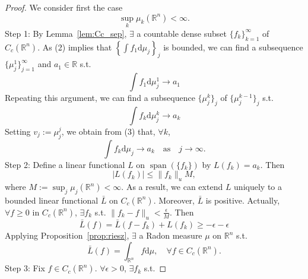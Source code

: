     \begin{proof}
    We consider first the case
        \begin{equation*}
            \sup_{k}\mu _{k}(\mathbb{R}^{n})<\infty. \tag{2}
        \end{equation*}
    Step 1:
    By Lemma~\ref{lem:Cc_sep}, $\exists$ a countable dense subset $\{ f_{k} \}_{k=1}^{\infty}$ of $C_{c}(\mathbb{R}^{n})$. As (2) implies that $\left\{  \int f_{1}\mathrm{d}\mu _{j}  \right\}_{j}$ is bounded, we can find a subsequence $\{ \mu _{j}^{1} \}_{j=1}^{\infty}$ and $a_{1}\in \mathbb{R}$ s.t.
        \begin{equation*}
            \int f_{1}\mathrm{d}\mu _{j}^{1}\to a_{1}
        \end{equation*}
    Repeating this argument, we can find a subsequence $\{ \mu _{j}^{k} \}_{j}$ of $\{ \mu _{j}^{k-1} \}_{j}$ s.t.
        \begin{equation*}
            \int f_{k}\mathrm{d}\mu _{j}^{k}\to a_{k}\tag{3}
        \end{equation*}
    Setting $v_{j}:=\mu _{j}^{j}$, we obtain from (3) that, $\forall k$,
        \begin{equation*}
            \int f_{k}\mathrm{d}\mu _{j}\to a_{k}\quad\text{as}\quad j\to \infty.
        \end{equation*}
    Step 2:
    Define a linear functional $L$ on $\operatorname{span}(\{ f_{k} \})$ by $L(f_{k})=a_{k}$. Then
        \begin{equation*}
            |L(f_{k})| \leq \| f_{k} \| _{u}M,
        \end{equation*}
    where $M:=\sup_{j}\mu _{j}(\mathbb{R}^{n})<\infty$. As a result, we can extend $L$ uniquely to a bounded linear functional $\bar{L}$ on $C_{c}(\mathbb{R}^{n})$. Moreover, $\bar{L}$ is positive. Actually, $\forall f\geq 0$ in $C_{c}(\mathbb{R}^{n})$, $\exists f_{k}$ s.t. $\| f_{k}-f \|_{u}< \frac{\epsilon}{M}$. Then
        \begin{equation*}
            \bar{L}(f)=\bar{L}(f-f_{k})+L(f_{k})\geq-\epsilon-\epsilon
        \end{equation*}
    Applying Proposition~\ref{prop:riesz}, $\exists$ a Radon measure $\mu$ on $\mathbb{R}^{n}$ s.t.
        \begin{equation*}
            \bar{L}(f)=\int _{\mathbb{R}^{n}}f \mathrm{d}\mu,\quad \forall f\in C_{c}(\mathbb{R}^{n}).
        \end{equation*}
    Step 3:
    Fix $f\in C_{c}(\mathbb{R}^{n})$. $\forall \epsilon>0$, $\exists f_{k}$ s.t.

\end{proof}
